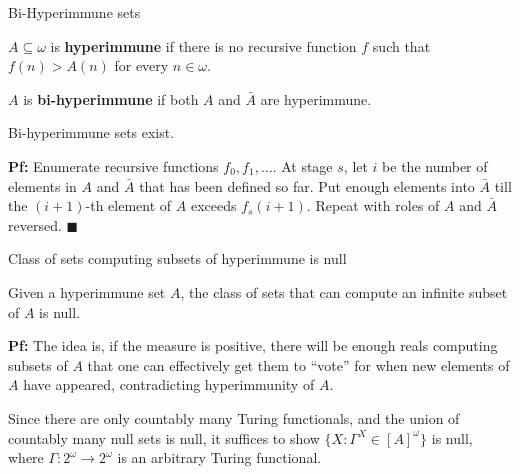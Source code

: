 \begin{frame}{Bi-Hyperimmune sets}
  \begin{define}
    $A\subseteq\omega$ is \textbf{hyperimmune} if there is no recursive
    function $f$ such that $f(n)>A(n)$ for every $n\in\omega$.
  \end{define}

  \begin{define}
    $A$ is \textbf{bi-hyperimmune} if both $A$ and $\bar{A}$ are hyperimmune.
  \end{define}

  \begin{thm}
    Bi-hyperimmune sets exist.
  \end{thm}

  \vspace{0.5em}
  \textbf{Pf:} Enumerate recursive functions $f_0,f_1,\ldots$. At stage
  $s$, let $i$ be the number of elements in $A$ and $\bar{A}$ that has been
  defined so far. Put enough elements into $\bar{A}$ till the $(i+1)$-th
  element of $A$ exceeds $f_s(i+1)$. Repeat with roles of $A$ and $\bar{A}$
  reversed. $\blacksquare$
\end{frame}

\begin{frame}{Class of sets computing subsets of hyperimmune is null}
  \begin{thm}
    \label{thm:bihyper-null}
    Given a hyperimmune set $A$, the class of sets that can compute an
    infinite subset of $A$ is null.
  \end{thm}

  \vspace{1em}
  \textbf{Pf:} The idea is, if the measure is positive, there will be
  enough reals computing subsets of $A$ that one can effectively get them
  to ``vote'' for when new elements of $A$ have appeared, contradicting
  hyperimmunity of $A$.

  \vspace{1em}
  Since there are only countably many Turing functionals, and the union of
  countably many null sets is null, it suffices to show $\{X:
  \Gamma^X\in[A]^\omega\}$ is null, where
  $\Gamma:2^\omega\rightarrow2^\omega$ is an arbitrary Turing functional.
\end{frame}


